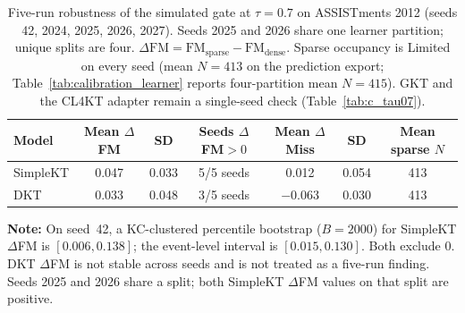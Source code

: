 \begin{table}[htbp]
\caption{Five-run robustness of the simulated gate at $\tau=0.7$ on ASSISTments 2012 (seeds 42, 2024, 2025, 2026, 2027). Seeds 2025 and 2026 share one learner partition; unique splits are four. $\Delta\mathrm{FM}=\mathrm{FM}_{\mathrm{sparse}}-\mathrm{FM}_{\mathrm{dense}}$. Sparse occupancy is Limited on every seed (mean $N=413$ on the prediction export; Table~\ref{tab:calibration_learner} reports four-partition mean $N=415$). GKT and the CL4KT adapter remain a single-seed check (Table~\ref{tab:c_tau07}).}
\label{tab:c_fivefold}
\centering
\footnotesize
\begin{tabular}{lcccccc}
\toprule
Model & Mean $\Delta$FM & SD & Seeds $\Delta$FM$>0$ & Mean $\Delta$Miss & SD & Mean sparse $N$ \\
\midrule
SimpleKT & 0.047 & 0.033 & 5/5 seeds & 0.012 & 0.054 & 413 \\
DKT & 0.033 & 0.048 & 3/5 seeds & $-0.063$ & 0.030 & 413 \\
\bottomrule
\end{tabular}

\vspace{1ex}
{\scriptsize \textbf{Note:} On seed~42, a KC-clustered percentile bootstrap ($B=2000$) for SimpleKT $\Delta$FM is $[0.006, 0.138]$; the event-level interval is $[0.015, 0.130]$. Both exclude 0. DKT $\Delta$FM is not stable across seeds and is not treated as a five-run finding. Seeds 2025 and 2026 share a split; both SimpleKT $\Delta$FM values on that split are positive.\par}
\end{table}
